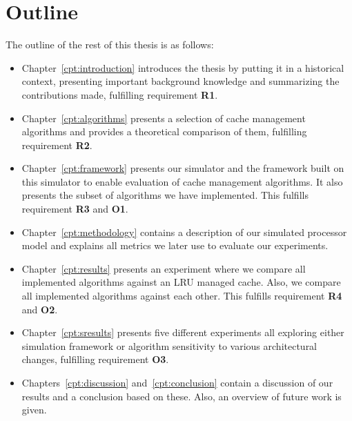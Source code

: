 \section{Outline}

The outline of the rest of this thesis is as follows:

\begin{itemize}
  \item Chapter~\ref{cpt:introduction} introduces the thesis by putting it in a historical context, presenting important background knowledge and summarizing the contributions made, fulfilling requirement \textbf{R1}.

  \item Chapter~\ref{cpt:algorithms} presents a selection of cache management algorithms and provides a theoretical comparison of them, fulfilling requirement \textbf{R2}.

  \item Chapter~\ref{cpt:framework} presents our simulator and the framework built on this simulator to enable evaluation of cache management algorithms. It also presents the subset of algorithms we have implemented. This fulfills requirement \textbf{R3} and \textbf{O1}.

  \item Chapter~\ref{cpt:methodology} contains a description of our simulated processor model and explains all metrics we later use to evaluate our experiments.

  \item Chapter~\ref{cpt:results} presents an experiment where we compare all implemented algorithms against an LRU managed cache. Also, we compare all implemented algorithms against each other. This fulfills requirement \textbf{R4} and \textbf{O2}.

  \item Chapter~\ref{cpt:sresults} presents five different experiments all exploring either simulation framework or algorithm sensitivity to various architectural changes, fulfilling requirement \textbf{O3}.

  \item Chapters~\ref{cpt:discussion} and~\ref{cpt:conclusion} contain a discussion of our results and a conclusion based on these. Also, an overview of future work is given.

\end{itemize}